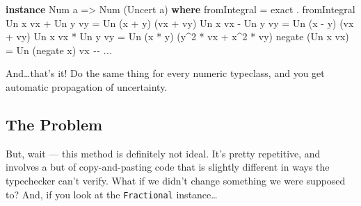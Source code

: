 \documentclass[]{article}
\newenvironment{Shaded}{}{}
\newcommand{\CommentTok}[1]{\textcolor[rgb]{0.38,0.63,0.69}{\textit{#1}}}
\newcommand{\DataTypeTok}[1]{\textcolor[rgb]{0.56,0.13,0.00}{#1}}
\newcommand{\DecValTok}[1]{\textcolor[rgb]{0.25,0.63,0.44}{#1}}
\newcommand{\FunctionTok}[1]{\textcolor[rgb]{0.02,0.16,0.49}{#1}}
\newcommand{\KeywordTok}[1]{\textcolor[rgb]{0.00,0.44,0.13}{\textbf{#1}}}
\newcommand{\NormalTok}[1]{#1}
\newcommand{\OperatorTok}[1]{\textcolor[rgb]{0.40,0.40,0.40}{#1}}
\newcommand{\OtherTok}[1]{\textcolor[rgb]{0.00,0.44,0.13}{#1}}
\begin{document}
\begin{Shaded}
\begin{Highlighting}[]
\KeywordTok{instance} \DataTypeTok{Num}\NormalTok{ a }\OtherTok{=>} \DataTypeTok{Num}\NormalTok{ (}\DataTypeTok{Uncert}\NormalTok{ a) }\KeywordTok{where}
    \FunctionTok{fromIntegral}      \OtherTok{=}\NormalTok{ exact }\OperatorTok{.} \FunctionTok{fromIntegral}
    \DataTypeTok{Un}\NormalTok{ x vx }\OperatorTok{+} \DataTypeTok{Un}\NormalTok{ y vy }\OtherTok{=} \DataTypeTok{Un}\NormalTok{ (x }\OperatorTok{+}\NormalTok{ y)    (vx }\OperatorTok{+}\NormalTok{ vy)}
    \DataTypeTok{Un}\NormalTok{ x vx }\OperatorTok{{-}} \DataTypeTok{Un}\NormalTok{ y vy }\OtherTok{=} \DataTypeTok{Un}\NormalTok{ (x }\OperatorTok{{-}}\NormalTok{ y)    (vx }\OperatorTok{+}\NormalTok{ vy)}
    \DataTypeTok{Un}\NormalTok{ x vx }\OperatorTok{*} \DataTypeTok{Un}\NormalTok{ y vy }\OtherTok{=} \DataTypeTok{Un}\NormalTok{ (x }\OperatorTok{*}\NormalTok{ y)    (y}\OperatorTok{\^{}}\DecValTok{2} \OperatorTok{*}\NormalTok{ vx }\OperatorTok{+}\NormalTok{ x}\OperatorTok{\^{}}\DecValTok{2} \OperatorTok{*}\NormalTok{ vy)}
    \FunctionTok{negate}\NormalTok{ (}\DataTypeTok{Un}\NormalTok{ x vx)  }\OtherTok{=} \DataTypeTok{Un}\NormalTok{ (}\FunctionTok{negate}\NormalTok{ x) vx}
    \CommentTok{{-}{-} ...}
\end{Highlighting}
\end{Shaded}

And\ldots that's it! Do the same thing for every numeric typeclass, and you get
automatic propagation of uncertainty.

\hypertarget{the-problem}{%
\subsection{The Problem}\label{the-problem}}

But, wait --- this method is definitely not ideal. It's pretty repetitive, and
involves a but of copy-and-pasting code that is slightly different in ways the
typechecker can't verify. What if we didn't change something we were supposed
to? And, if you look at the \texttt{Fractional} instance\ldots{}
\end{document}
